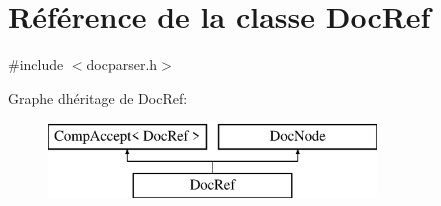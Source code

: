 \hypertarget{class_doc_ref}{}\section{Référence de la classe Doc\+Ref}
\label{class_doc_ref}


{\ttfamily \#include $<$docparser.\+h$>$}

Graphe d\textquotesingle{}héritage de Doc\+Ref\+:\begin{figure}[H]
\begin{center}
\leavevmode
\includegraphics[height=2.000000cm]{class_doc_ref}
\end{center}
\end{figure}
